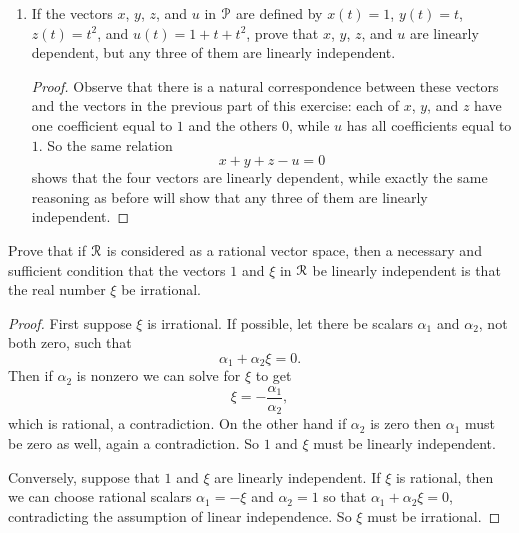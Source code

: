 \begin{enumerate}
\begin{proof}
    So let
    \begin{equation*}
      \alpha_1x + \alpha_2y + \alpha_3u = 0.
    \end{equation*}
    By equating the third coordinate of each side we get
    $\alpha_3 = 0$. Then from the first coordinates we get
    $\alpha_1 + \alpha_3 = 0$ so that $\alpha_1 = 0$. Similarly, from
    the second coordinates we get $\alpha_2 = 0$. Therefore
    $\alpha_1,\alpha_2,\alpha_3$ must all be zero, which establishes
    the linear independence of the three vectors, completing the
    proof.
  \end{proof}
\item If the vectors $x$, $y$, $z$, and $u$ in $\P$ are defined by
  $x(t) = 1$, $y(t) = t$, $z(t) = t^2$, and $u(t) = 1 + t + t^2$,
  prove that $x$, $y$, $z$, and $u$ are linearly dependent, but any
  three of them are linearly independent.
  \begin{proof}
    Observe that there is a natural correspondence between these
    vectors and the vectors in the previous part of this exercise:
    each of $x$, $y$, and $z$ have one coefficient equal to $1$ and
    the others $0$, while $u$ has all coefficients equal to $1$. So
    the same relation
    \begin{equation*}
      x + y + z - u = 0
    \end{equation*}
    shows that the four vectors are linearly dependent, while exactly
    the same reasoning as before will show that any three of them are
    linearly independent.
  \end{proof}
\end{enumerate}

 Prove that if $\R$ is considered as a rational vector
space, then a necessary and sufficient condition that the vectors $1$
and $\xi$ in $\R$ be linearly independent is that the real number
$\xi$ be irrational.
\begin{proof}
  First suppose $\xi$ is irrational. If possible, let there be scalars
  $\alpha_1$ and $\alpha_2$, not both zero, such that
  \begin{equation*}
    \alpha_1 + \alpha_2\xi = 0.
  \end{equation*}
  Then if $\alpha_2$ is nonzero we can solve for $\xi$ to get
  \begin{equation*}
    \xi = -\frac{\alpha_1}{\alpha_2},
  \end{equation*}
  which is rational, a contradiction. On the other hand if $\alpha_2$
  is zero then $\alpha_1$ must be zero as well, again a
  contradiction. So $1$ and $\xi$ must be linearly independent.

  Conversely, suppose that $1$ and $\xi$ are linearly independent. If
  $\xi$ is rational, then we can choose rational scalars
  $\alpha_1 = -\xi$ and $\alpha_2 = 1$ so that
  $\alpha_1 + \alpha_2\xi = 0$, contradicting the assumption of linear
  independence. So $\xi$ must be irrational.
\end{proof}

